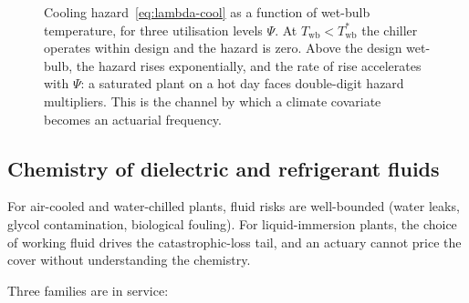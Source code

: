 \begin{figure}[ht]
\centering
{}
\caption{Cooling hazard~\eqref{eq:lambda-cool} as a function of
wet-bulb temperature, for three utilisation levels $\Psi$. At
$T_{\mathrm{wb}}<T^*_{\mathrm{wb}}$ the chiller operates within
design and the hazard is zero. Above the design wet-bulb, the hazard
rises exponentially, and the rate of rise accelerates with $\Psi$:
a saturated plant on a hot day faces double-digit hazard
multipliers. This is the channel by which a climate covariate becomes
an actuarial frequency.}
\label{fig:cool-hazard}
\end{figure}

\subsection{Chemistry of dielectric and refrigerant fluids}\label{ss:cool-chem}

For air-cooled and water-chilled plants, fluid risks are well-bounded
(water leaks, glycol contamination, biological fouling). For
liquid-immersion plants, the choice of working fluid drives the
catastrophic-loss tail, and an actuary cannot price the cover without
understanding the chemistry.

Three families are in service:


